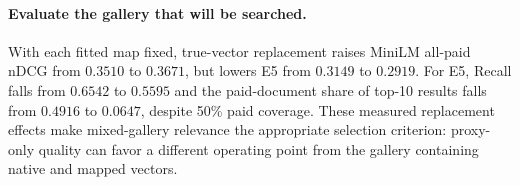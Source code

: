 \paragraph{Evaluate the gallery that will be searched.}
With each fitted map fixed, true-vector replacement raises MiniLM all-paid
nDCG from $0.3510$ to $0.3671$, but lowers E5 from $0.3149$ to $0.2919$.
For E5, Recall falls from $0.6542$ to $0.5595$ and the paid-document share of
top-10 results falls from $0.4916$ to $0.0647$, despite 50\% paid coverage.
These measured replacement effects make mixed-gallery relevance the
appropriate selection criterion: proxy-only quality can favor a different
operating point from the gallery containing native and mapped vectors.
